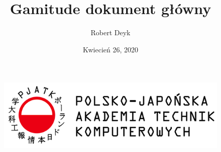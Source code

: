 \documentclass[a4paper,11pt]{report}
\begin{document}
\title{\textbf{Gamitude dokument główny}}
\author{Robert Deyk}
\date{Kwiecień 26, 2020}

\maketitle
\let\cleardoublepage\clearpage
\begin{figure}[ht]
\centering
\includegraphics{pjatk.png}
\end{figure}
\end{document}
